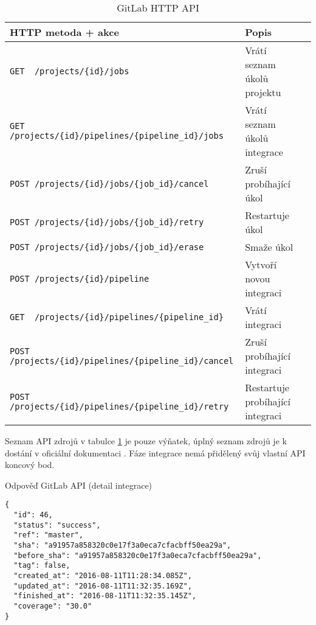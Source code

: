 \begin{table}[htbp]
\centering
\fontsize{9.5}{11.5}\selectfont
\caption{GitLab HTTP API}
\label{table:gitlab-api-spec}
\begin{tabular}{|l|l|l|}
\hline
HTTP metoda + akce                                          & Popis \\ \hline
\verb|GET  /projects/{id}/jobs|                             & Vrátí seznam úkolů projektu      \\ \hline
\verb|GET  /projects/{id}/pipelines/{pipeline_id}/jobs|     & Vrátí seznam úkolů integrace      \\ \hline
\verb|POST /projects/{id}/jobs/{job_id}/cancel|             & Zruší probíhající úkol      \\ \hline
\verb|POST /projects/{id}/jobs/{job_id}/retry|              & Restartuje úkol      \\ \hline
\verb|POST /projects/{id}/jobs/{job_id}/erase|              & Smaže úkol      \\ \hline
\verb|POST /projects/{id}/pipeline|                         & Vytvoří novou integraci      \\ \hline
\verb|GET  /projects/{id}/pipelines/{pipeline_id}|          & Vrátí integraci      \\ \hline
\verb|POST /projects/{id}/pipelines/{pipeline_id}/cancel|   & Zruší probíhající integraci      \\ \hline
\verb|POST /projects/{id}/pipelines/{pipeline_id}/retry|    & Restartuje probíhající integraci      \\ \hline
\end{tabular}
\end{table}

Seznam API zdrojů v tabulce \ref{table:gitlab-api-spec} je pouze výňatek, úplný seznam zdrojů je k dostání v oficiální dokumentaci \cite{gitlab_api}. 
Fáze integrace nemá přidělený svůj vlastní API koncový bod.

\begin{listing}[ht]
\caption{\label{code:gitlab-api-json-response}Odpověď GitLab API (detail integrace)}
\begin{verbatim}
{
  "id": 46,
  "status": "success",
  "ref": "master",
  "sha": "a91957a858320c0e17f3a0eca7cfacbff50ea29a",
  "before_sha": "a91957a858320c0e17f3a0eca7cfacbff50ea29a",
  "tag": false,
  "created_at": "2016-08-11T11:28:34.085Z",
  "updated_at": "2016-08-11T11:32:35.169Z",
  "finished_at": "2016-08-11T11:32:35.145Z",
  "coverage": "30.0"
}
\end{verbatim}
\end{listing}

